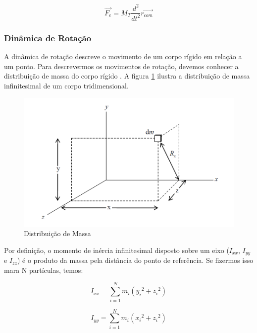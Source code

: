 \begin{equation}
\vec{F_e}=M_{T}\frac{{d}^{2}}{{d}t^{2}}\vec{r_{com}} 
\end{equation}

\subsubsection{Dinâmica de Rotação}

A dinâmica de rotação descreve o movimento de um corpo rígido em relação a um ponto. Para descrevermos os movimentos de rotação, devemos conhecer a distribuição de massa do corpo rígido \cite{Snider}. A figura \ref{fig:mass_snider_p16} ilustra a distribuição de massa infinitesimal de um corpo tridimensional. 

\begin{figure}[!ht]
  \caption{Distribuição de Massa}
  \begin{center}
      \includegraphics[scale=0.5]{img/mass_snider_p16}
  \end{center}
  \label{fig:mass_snider_p16}
\end{figure}


Por definição, o momento de inércia infinitesimal disposto sobre um eixo ($I_{xx}$, $I_{yy}$ e $I_{zz}$) é o produto da massa pela distância do ponto de referência. Se fizermos isso mara N partículas, temos:

\begin{equation}
  I_{xx}=\sum_{i=1}^{N}{m_i({y_i}^{2}+{z_i}^{2})}
\end{equation}

\begin{equation}
  I_{yy}=\sum_{i=1}^{N}{m_i({x_i}^{2}+{z_i}^{2})}
\end{equation}

